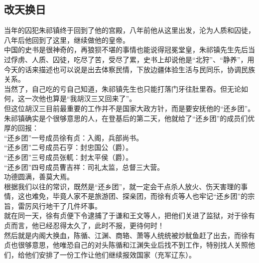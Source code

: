 	\begin{multicols}{\theparacolNo}
\fi
\subsection{改天换日}
当年的囚犯朱祁镇终于回到了他的宫殿，八年前他从这里出发，沦为人质和囚徒，八年后他回到了这里，继续做他的皇帝。\\

中国的史书是很神奇的，再狼狈不堪的事情也能说得冠冕堂皇，朱祁镇先生先后当过俘虏、人质、囚徒，吃尽了苦，受尽了累，史书上却说他是“北狩”、“静养”，用今天的话来描述也可以说是出去体察民情，下放边疆体验生活与民同乐，协调民族关系。\\

当然了，自己吃的亏自己知道，朱祁镇先生也只能打落门牙往肚里吞。但无论如何，这一次他也算是“我胡汉三又回来了”。\\

但这位胡汉三目前最重要的工作并不是国家大政方针，而是要安抚他的“还乡团”。\\

朱祁镇确实是个很够意思的人，在登基后的第二天，他就给了“还乡团”的成员们优厚的回报：\\

“还乡团”一号成员徐有贞：入阁，兵部尚书。\\

“还乡团”二号成员石亨：封忠国公（爵）。\\

“还乡团”三号成员张軏：封太平侯（爵）。\\

“还乡团”四号成员曹吉祥：司礼太监，总督三大营。\\

功德圆满，善莫大焉。\\

根据我们以往的常识，既然是“还乡团”，就一定会干点杀人放火、伤天害理的事情，这也难免，毕竟人家不是旅游团、探亲团，而徐有贞等人也牢记“还乡团”的宗旨，雷厉风行地干了几件坏事。\\

就在同一天，徐有贞便下令逮捕了于谦和王文等人，把他们关进了监狱，对于徐有贞而言，他已经忍得太久了，此时不报，更待何时！\\

然后就是内阁大换血，陈循、江渊、商辂、萧等人统统被炒鱿鱼赶了出去，而徐有贞也很够意思，他唯恐自己的对头陈循和江渊失业后找不到工作，特别找人关照他们，给他们安排了一份工作让他们继续报效国家（充军辽东）。\\


\end{multicols}
